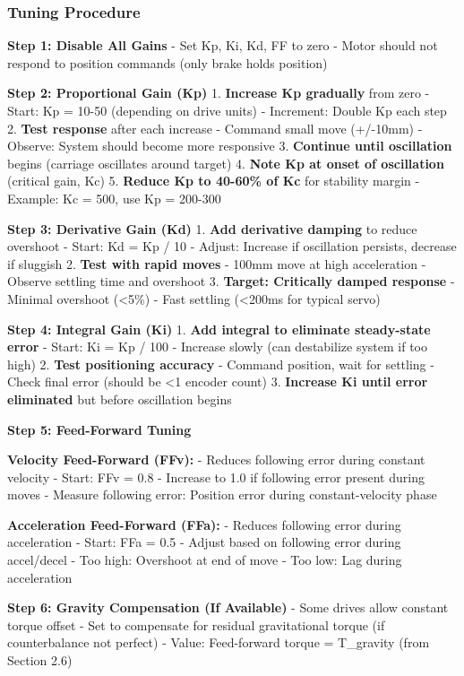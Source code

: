 \documentclass[
]{article}
\begin{document}
\subsubsection{Tuning Procedure}\label{tuning-procedure}

\textbf{Step 1: Disable All Gains} - Set Kp, Ki, Kd, FF to zero - Motor
should not respond to position commands (only brake holds position)

\textbf{Step 2: Proportional Gain (Kp)} 1. \textbf{Increase Kp
gradually} from zero - Start: Kp = 10-50 (depending on drive units) -
Increment: Double Kp each step 2. \textbf{Test response} after each
increase - Command small move (+/-10mm) - Observe: System should become
more responsive 3. \textbf{Continue until oscillation} begins (carriage
oscillates around target) 4. \textbf{Note Kp at onset of oscillation}
(critical gain, Kc) 5. \textbf{Reduce Kp to 40-60\% of Kc} for stability
margin - Example: Kc = 500, use Kp = 200-300

\textbf{Step 3: Derivative Gain (Kd)} 1. \textbf{Add derivative damping}
to reduce overshoot - Start: Kd = Kp / 10 - Adjust: Increase if
oscillation persists, decrease if sluggish 2. \textbf{Test with rapid
moves} - 100mm move at high acceleration - Observe settling time and
overshoot 3. \textbf{Target: Critically damped response} - Minimal
overshoot (\textless5\%) - Fast settling (\textless200ms for typical
servo)

\textbf{Step 4: Integral Gain (Ki)} 1. \textbf{Add integral to eliminate
steady-state error} - Start: Ki = Kp / 100 - Increase slowly (can
destabilize system if too high) 2. \textbf{Test positioning accuracy} -
Command position, wait for settling - Check final error (should be
\textless1 encoder count) 3. \textbf{Increase Ki until error eliminated}
but before oscillation begins

\textbf{Step 5: Feed-Forward Tuning}

\textbf{Velocity Feed-Forward (FFv):} - Reduces following error during
constant velocity - Start: FFv = 0.8 - Increase to 1.0 if following
error present during moves - Measure following error: Position error
during constant-velocity phase

\textbf{Acceleration Feed-Forward (FFa):} - Reduces following error
during acceleration - Start: FFa = 0.5 - Adjust based on following error
during accel/decel - Too high: Overshoot at end of move - Too low: Lag
during acceleration

\textbf{Step 6: Gravity Compensation (If Available)} - Some drives allow
constant torque offset - Set to compensate for residual gravitational
torque (if counterbalance not perfect) - Value: Feed-forward torque =
T\_gravity (from Section 2.6)
\end{document}
